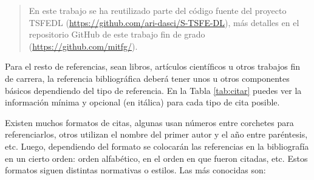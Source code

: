 \begin{quote}
\begin{it}
    En este trabajo se ha reutilizado parte del código fuente del proyecto TSFEDL (\url{https://github.com/ari-dasci/S-TSFE-DL}), más detalles en el repositorio GitHub de este trabajo fin de grado (\url{https://github.com/mitfg/}).
\end{it}
\end{quote}

Para el resto de referencias, sean libros, artículos científicos u otros trabajos fin de carrera, la referencia bibliográfica deberá tener unos u otros componentes básicos dependiendo del tipo de referencia. En la Tabla \ref{tab:citar} puedes ver la información mínima y opcional (en itálica) para cada tipo de cita posible.
    
\begin{naranja}
Existen muchos formatos de citas, algunas usan números entre corchetes para referenciarlos, otros utilizan el nombre del primer autor y el año entre paréntesis, etc. Luego, dependiendo del formato se colocarán las referencias en la bibliografía en un cierto orden: orden alfabético, en el orden en que fueron citadas, etc. Estos formatos siguen distintas normativas o estilos. Las más conocidas son:


\end{naranja}
